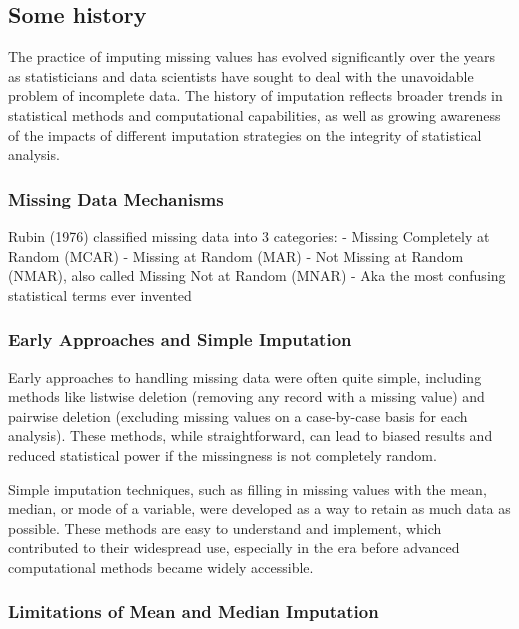 \documentclass[
]{book}
\begin{document}
\subsection*{Some history}\label{some-history}

The practice of imputing missing values has evolved significantly over
the years as statisticians and data scientists have sought to deal with
the unavoidable problem of incomplete data. The history of imputation
reflects broader trends in statistical methods and computational
capabilities, as well as growing awareness of the impacts of different
imputation strategies on the integrity of statistical analysis.

\subsubsection*{Missing Data Mechanisms}\label{missing-data-mechanisms}

Rubin (1976) classified missing data into 3 categories: - Missing
Completely at Random (MCAR) - Missing at Random (MAR) - Not Missing at
Random (NMAR), also called Missing Not at Random (MNAR) - Aka the most
confusing statistical terms ever invented

\subsubsection*{Early Approaches and Simple Imputation}\label{early-approaches-and-simple-imputation}

Early approaches to handling missing data were often quite simple,
including methods like listwise deletion (removing any record with a
missing value) and pairwise deletion (excluding missing values on a
case-by-case basis for each analysis). These methods, while
straightforward, can lead to biased results and reduced statistical
power if the missingness is not completely random.

Simple imputation techniques, such as filling in missing values with the
mean, median, or mode of a variable, were developed as a way to retain
as much data as possible. These methods are easy to understand and
implement, which contributed to their widespread use, especially in the
era before advanced computational methods became widely accessible.

\subsubsection*{Limitations of Mean and Median Imputation}\label{limitations-of-mean-and-median-imputation}
\end{document}
